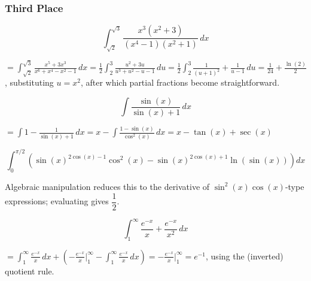 \subsubsection*{Third Place}
\begin{questions}

\question \[ \int_{\sqrt2}^{\sqrt3} \frac{x^3(x^2+3)}{(x^4-1)(x^2+1)}\, dx \]
\begin{solution}
$= \displaystyle\int_{\sqrt2}^{\sqrt3} \frac{x^5+3x^3}{x^6+x^4-x^2-1}\, dx = \frac{1}{2}\int_2^3 \frac{u^2+3u}{u^3+u^2-u-1}\, du = \frac{1}{2}\int_2^3 \frac{1}{(u+1)^2}+\frac{1}{u-1}\, du = \frac{1}{24}+\frac{\ln(2)}{2}$,
substituting $u=x^2$, after which partial fractions become straightforward.
\end{solution}

\question \[ \int \frac{\sin(x)}{\sin(x)+1}\, dx \]
\begin{solution}
$= \displaystyle\int 1 - \frac{1}{\sin(x)+1}\, dx = x - \int \frac{1-\sin(x)}{\cos^2(x)}\, dx = x - \tan(x) + \sec(x)$
\end{solution}

\question \[ \int_0^{\pi/2} \left(\sin(x)^{2\cos(x)-1}\cos^2(x) - \sin(x)^{2\cos(x)+1}\ln(\sin(x))\right) dx \]
\begin{solution}
Algebraic manipulation reduces this to the derivative of $\sin^2(x)\cos(x)$-type expressions; evaluating gives $\dfrac{1}{2}$.
\end{solution}

\question \[ \int_1^\infty \frac{e^{-x}}{x}+\frac{e^{-x}}{x^2}\, dx \]
\begin{solution}
$= \displaystyle\int_1^\infty \frac{e^{-x}}{x}\, dx + \left(-\frac{e^{-x}}{x}\Big|_1^\infty - \int_1^\infty \frac{e^{-x}}{x}\, dx\right) = -\frac{e^{-x}}{x}\Big|_1^\infty = e^{-1}$, using the (inverted) quotient rule.
\end{solution}

\end{questions}

